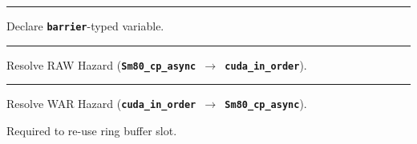 \newpage
{}

{\large

}

\vspace{3mm}
\hrule

{\LARGE
Declare \textbf{\texttt{barrier}}-typed variable.

}

\newpage
{}

{\large

}

\vspace{3mm}
\hrule

{\LARGE
Resolve RAW Hazard (\textbf{\texttt{Sm80\_cp\_async $\to$ cuda\_in\_order}}).

}

\newpage
{}

{\large

}

\vspace{3mm}
\hrule

{\LARGE
Resolve WAR Hazard (\textbf{\texttt{cuda\_in\_order $\to$ Sm80\_cp\_async}}).

Required to re-use ring buffer slot.

}















